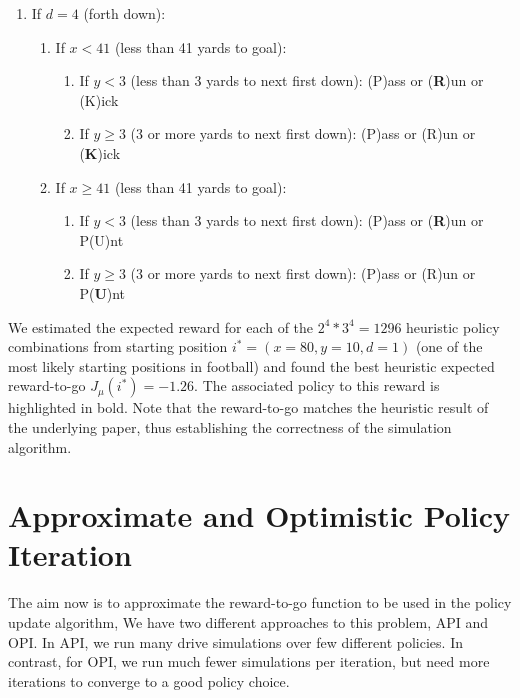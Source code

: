 \documentclass[11pt, oneside]{article}   	%
\begin{document}
\begin{enumerate}
\item If $d=4$ (forth down):
\begin{enumerate}
\item If $x<41$ (less than 41 yards to goal):
\begin{enumerate}
\item If $y<3$ (less than 3 yards to next first down): (P)ass or (\textbf{R})un or (K)ick
\item If $y\geq3$ (3 or more yards to next first down): (P)ass or (R)un or (\textbf{K})ick
\end{enumerate}
\item If $x \geq 41$ (less than 41 yards to goal):
\begin{enumerate}
\item If $y<3$ (less than 3 yards to next first down): (P)ass or (\textbf{R})un or P(U)nt
\item If $y\geq3$ (3 or more yards to next first down): (P)ass or (R)un or P(\textbf{U})nt
\end{enumerate}
\end{enumerate}

\end{enumerate}

We estimated the expected reward for each of the $2^4*3^4 = 1296$ heuristic policy combinations from starting position $i^* = (x=80, y=10, d=1)$ (one of the most likely starting positions in football) and found the best heuristic expected reward-to-go $J_{\mu}(i^*) = -1.26$. The associated policy to this reward is highlighted in bold. Note that the reward-to-go matches the heuristic result of the underlying paper, thus establishing the correctness of the simulation algorithm.

\section{Approximate and Optimistic Policy Iteration}
The aim now is to approximate the reward-to-go function to be used in the policy update algorithm, We have two different approaches to this problem, API and OPI. In API, we run many drive simulations over few different policies. In contrast, for OPI, we run much fewer simulations per iteration, but need more iterations to converge to a good policy choice.\\
\end{document}
